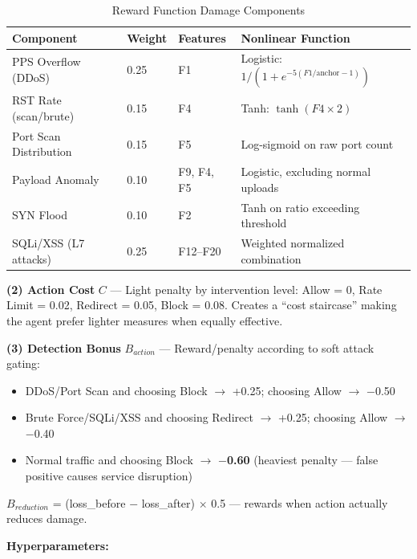 \documentclass[12pt,a4paper]{report}
\begin{document}
\begin{table}[h!]
\centering
\caption{Reward Function Damage Components}
\begin{tabular}{L{3.5cm} C{1.5cm} C{2cm} L{5cm}}
\toprule
\textbf{Component} & \textbf{Weight} & \textbf{Features} & \textbf{Nonlinear Function} \\
\midrule
PPS Overflow (DDoS) & 0.25 & F1 & Logistic: $1/(1+e^{-5(F1/\text{anchor}-1)})$ \\
RST Rate (scan/brute) & 0.15 & F4 & Tanh: $\tanh(F4 \times 2)$ \\
Port Scan Distribution & 0.15 & F5 & Log-sigmoid on raw port count \\
Payload Anomaly & 0.10 & F9, F4, F5 & Logistic, excluding normal uploads \\
SYN Flood & 0.10 & F2 & Tanh on ratio exceeding threshold \\
SQLi/XSS (L7 attacks) & 0.25 & F12--F20 & Weighted normalized combination \\
\bottomrule
\end{tabular}
\end{table}

\textbf{(2) Action Cost} $C$ --- Light penalty by intervention level: Allow = 0, Rate Limit = 0.02, Redirect = 0.05, Block = 0.08. Creates a ``cost staircase'' making the agent prefer lighter measures when equally effective.

\textbf{(3) Detection Bonus} $B_{action}$ --- Reward/penalty according to soft attack gating:
\begin{itemize}
  \item DDoS/Port Scan and choosing Block $\to$ +0.25; choosing Allow $\to$ $-$0.50
  \item Brute Force/SQLi/XSS and choosing Redirect $\to$ +0.25; choosing Allow $\to$ $-$0.40
  \item Normal traffic and choosing Block $\to$ \textbf{$-$0.60} (heaviest penalty --- false positive causes service disruption)
\end{itemize}

$B_{reduction}$ = (loss\_before $-$ loss\_after) $\times$ 0.5 --- rewards when action actually reduces damage.

\textbf{Hyperparameters:}
\end{document}
